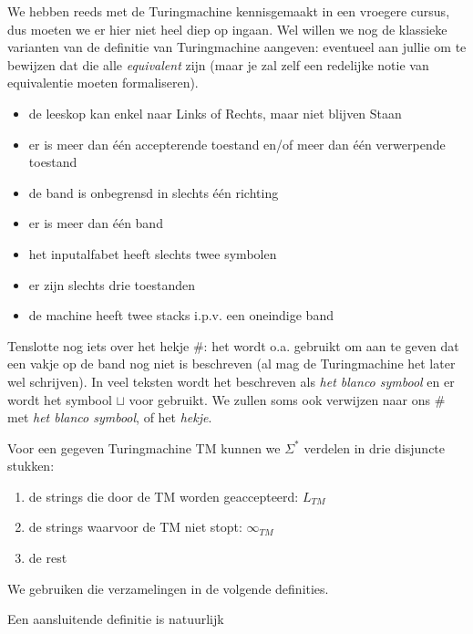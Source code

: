 We hebben reeds met de Turingmachine kennisgemaakt in een vroegere
cursus, dus moeten we er hier niet heel diep op ingaan. Wel willen we
nog de klassieke varianten van de definitie van Turingmachine
aangeven: eventueel aan jullie om te bewijzen dat die alle {\em
equivalent} zijn (maar je zal zelf een redelijke notie van
equivalentie moeten formaliseren).

\begin{itemize}
\item de leeskop kan enkel naar Links of Rechts, maar niet blijven Staan
\item er is meer dan \'{e}\'{e}n accepterende toestand en/of meer dan
\'{e}\'{e}n verwerpende toestand
\item de band is onbegrensd in slechts \'{e}\'{e}n richting
\item er is meer dan \'{e}\'{e}n band
\item het inputalfabet heeft slechts twee symbolen\label{twosymbols}
\item er zijn slechts drie toestanden
\item de machine heeft twee stacks i.p.v. een oneindige band
\end{itemize}


Tenslotte nog iets over het hekje \#: het wordt o.a. gebruikt om aan
te geven dat een vakje op de band nog niet is beschreven (al mag de
Turingmachine het later wel schrijven). In veel teksten wordt het
beschreven als {\em het blanco symbool} en er wordt het symbool $\sqcup$
voor gebruikt. We zullen soms ook verwijzen naar ons \# met {\em het
blanco symbool}, of het {\em hekje}.


Voor een gegeven Turingmachine TM kunnen we $\Sigma^*$ verdelen in drie
disjuncte stukken:
\begin{enumerate}
\item de strings die door de TM worden geaccepteerd: $L_{TM}$
\item de strings waarvoor de TM niet stopt: $\infty_{TM}$
\item de rest
\end{enumerate}
We gebruiken die verzamelingen in de volgende definities.



Een aansluitende definitie is natuurlijk

